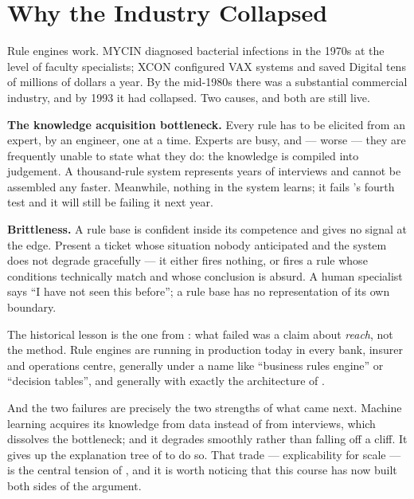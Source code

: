 \section{Why the Industry Collapsed}

Rule engines work. MYCIN diagnosed bacterial infections in the 1970s at the level of
faculty specialists; XCON configured VAX systems and saved Digital tens of millions
of dollars a year. By the mid-1980s there was a substantial commercial industry, and
by 1993 it had collapsed. Two causes, and both are still live.

\textbf{The knowledge acquisition bottleneck.} Every rule has to be elicited from an
expert, by an engineer, one at a time. Experts are busy, and --- worse --- they are
frequently unable to state what they do: the knowledge is compiled into judgement.
A thousand-rule system represents years of interviews and cannot be assembled any
faster. Meanwhile, nothing in the system learns; it fails
's fourth test and it will still be failing it next year.

\textbf{Brittleness.} A rule base is confident inside its competence and gives no
signal at the edge. Present a ticket whose situation nobody anticipated and the
system does not degrade gracefully --- it either fires nothing, or fires a rule
whose conditions technically match and whose conclusion is absurd. A human
specialist says ``I have not seen this before''; a rule base has no representation
of its own boundary.

\begin{conceptbox}
The historical lesson is the one from : what failed was a claim
about \emph{reach}, not the method. Rule engines are running in production today in
every bank, insurer and operations centre, generally under a name like ``business
rules engine'' or ``decision tables'', and generally with exactly the architecture of
.

And the two failures are precisely the two strengths of what came next. Machine
learning acquires its knowledge from data instead of from interviews, which dissolves
the bottleneck; and it degrades smoothly rather than falling off a cliff. It gives up
the explanation tree of  to do so. That trade --- explicability
for scale --- is the central tension of , and it is worth
noticing that this course has now built both sides of the argument.
\end{conceptbox}

